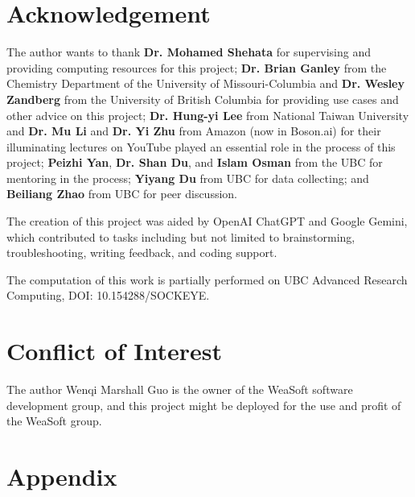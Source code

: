 \documentclass[12pt]{article}
\begin{document}
\section*{Acknowledgement} 
The author wants to thank  \textbf{Dr. Mohamed Shehata} for supervising and providing computing resources for this project; \textbf{Dr. Brian Ganley} from the Chemistry Department of the University of Missouri-Columbia and \textbf{Dr. Wesley Zandberg} from the University of British Columbia for providing use cases and other advice on this project; \textbf{Dr. Hung-yi Lee} from National Taiwan University and \textbf{Dr. Mu Li} and \textbf{Dr. Yi Zhu} from Amazon (now in Boson.ai) for their illuminating lectures on YouTube played an essential role in the process of this project; \textbf{Peizhi Yan}, \textbf{Dr. Shan Du}, and \textbf{Islam Osman} from the UBC for mentoring in the process; \textbf{Yiyang Du} from UBC for data collecting; and \textbf{Beiliang Zhao} from UBC for peer discussion.


The creation of this project was aided by OpenAI ChatGPT and Google Gemini, which contributed to tasks including but not limited to brainstorming, troubleshooting, writing feedback, and coding support.

The computation of this work is partially performed on UBC Advanced Research Computing, DOI: 10.154288/SOCKEYE.
\section*{Conflict of Interest}
The author Wenqi Marshall Guo is the owner of the WeaSoft software development group, and this project might be deployed for the use and profit of the WeaSoft group. 
\printbibliography
\pagebreak 
\section*{Appendix}
\end{document}
